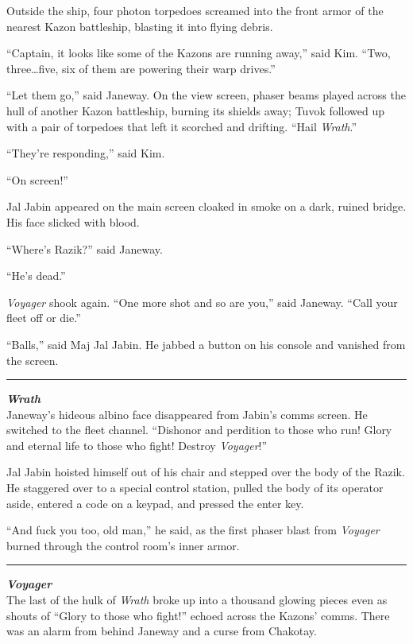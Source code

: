 \documentclass[twoside,letterpaper,12pt]{memoir}
\begin{document}
Outside the ship, four photon torpedoes screamed into the front armor of the nearest Kazon battleship, blasting it into flying debris. 

``Captain, it looks like some of the Kazons are running away,'' said Kim. ``Two, three\ldots five, six of them are powering their warp drives.'' 

``Let them go,'' said Janeway. On the view screen, phaser beams played across the hull of another Kazon battleship, burning its shields away; Tuvok followed up with a pair of torpedoes that left it scorched and drifting. ``Hail \textit{Wrath}.'' 

``They're responding,'' said Kim. 

``On screen!'' 

Jal Jabin appeared on the main screen cloaked in smoke on a dark, ruined bridge. His face slicked with blood. 

``Where's Razik?'' said Janeway. 

``He's dead.'' 

\textit{Voyager }shook again. ``One more shot and so are you,'' said Janeway. ``Call your fleet off or die.'' 

``Balls,'' said Maj Jal Jabin. He jabbed a button on his console and vanished from the screen. 

\fancybreak{\rule{3cm}{0.4 pt}} 

\noindent\textit{\textbf{Wrath}}\\

Janeway's hideous albino face disappeared from Jabin's comms screen. He switched to the fleet channel. ``Dishonor and perdition to those who run! Glory and eternal life to those who fight! Destroy \textit{Voyager}!'' 

Jal Jabin hoisted himself out of his chair and stepped over the body of the Razik. He staggered over to a special control station, pulled the body of its operator aside, entered a code on a keypad, and pressed the enter key. 

``And fuck you too, old man,'' he said, as the first phaser blast from \textit{Voyager} burned through the control room's inner armor. 

\fancybreak{\rule{3cm}{0.4 pt}} 

\noindent\textit{\textbf{Voyager}}\\

The last of the hulk of \textit{Wrath} broke up into a thousand glowing pieces even as shouts of ``Glory to those who fight!'' echoed across the Kazons' comms. There was an alarm from behind Janeway and a curse from Chakotay. 
\end{document}
